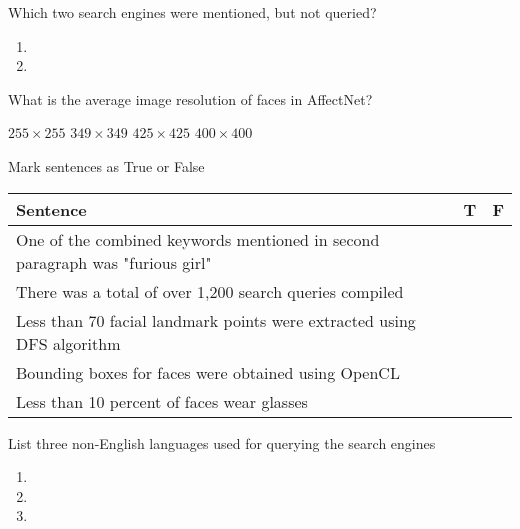 \begin{questions}

	\question[1] Which two search engines were mentioned, but not queried?
	\begin{enumerate}
		\item \enspace\hrulefill
		\item \enspace\hrulefill
	\end{enumerate}

	\question[1] What is the average image resolution of faces in AffectNet?
	\begin{checkboxes}
		\choice $255 \times 255$
		\choice $349 \times 349$
		\choice $425 \times 425$
		\choice $400 \times 400$
	\end{checkboxes}

	\question[5] Mark sentences as True or False

	\begin{tabular}{|l|l|l|}
		\hline
		\textbf{Sentence} & \textbf{T} & \textbf{F} \\ \hline
		One of the combined keywords mentioned in second paragraph was "furious girl" & & \\ \hline
		There was a total of over 1,200 search queries compiled & & \\ \hline
		Less than 70 facial landmark points were extracted using DFS algorithm & & \\\hline
		Bounding boxes for faces were obtained using OpenCL & & \\ \hline
		Less than 10 percent of faces wear glasses & & \\\hline
	\end{tabular}

	\question[3] List three non-English languages used for querying the search engines
	\begin{enumerate}
		\item \enspace\hrulefill
		\item \enspace\hrulefill
		\item \enspace\hrulefill
	\end{enumerate}

\end{questions}

\begin{center}
	\gradetable[h][questions]
\end{center}

